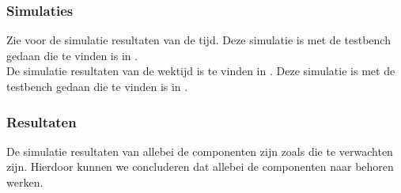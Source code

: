 \subsubsection{Simulaties}
Zie \cite{fig:sim_tijd} voor de simulatie resultaten van de tijd. Deze simulatie is met de testbench gedaan die te vinden is in \cite{code:tb_tijd}.\\
De simulatie resultaten van de wektijd is te vinden in \cite{fig:sim_wektijd}. Deze simulatie is met de testbench gedaan die te vinden is in \cite{code:tb_wektijd}.

\subsubsection{Resultaten}
De simulatie resultaten van allebei de componenten zijn zoals die te verwachten zijn. Hierdoor kunnen we concluderen dat allebei de componenten naar behoren werken.


